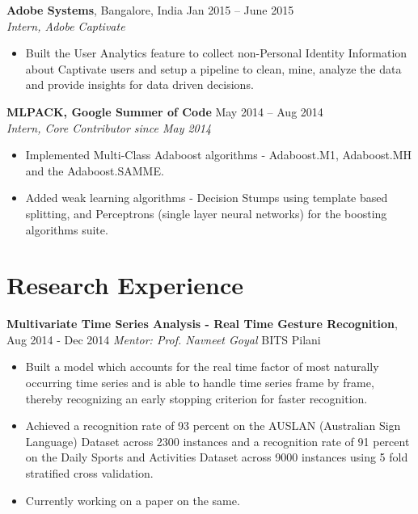 \documentclass[letterpaper]{article}
\begin{document}
\vspace{-0.5mm}
\textbf{Adobe Systems}, Bangalore, India \hfill Jan 2015 -- June 2015\\
\emph{Intern, Adobe Captivate}\\
\vspace{-6mm}
\begin{itemize}
\item Built the User Analytics feature to collect non-Personal Identity Information about Captivate users and setup a pipeline to clean, mine, analyze the data and provide insights for data driven decisions.
\end{itemize}

\vspace{-0.6mm}
\textbf{MLPACK, Google Summer of Code} \hfill May 2014 -- Aug 2014\\
\emph{Intern, Core Contributor since May 2014}\\
\vspace{-6mm}
\begin{itemize}
\item Implemented Multi-Class Adaboost algorithms - Adaboost.M1, Adaboost.MH and the Adaboost.SAMME.
\vspace{-2mm}
\item Added weak learning algorithms - Decision Stumps using template based splitting, and Perceptrons (single layer neural networks) for the boosting algorithms suite.
\end{itemize}


\section*{Research Experience}
\textbf{Multivariate Time Series Analysis - Real Time Gesture Recognition},  \hfill
Aug 2014 - Dec 2014
\emph{Mentor: Prof. Navneet Goyal} \hfill
BITS Pilani\\
\vspace{-6mm}
\begin{itemize}
\item Built a model which accounts for the real time factor of most naturally occurring time series and is able to handle time series frame by frame, thereby recognizing an early stopping criterion for faster recognition. 
\vspace{-2mm}
\item Achieved a recognition rate of 93 percent on the AUSLAN (Australian Sign Language) Dataset across 2300 instances and a recognition rate of 91 percent on the Daily Sports and Activities Dataset across 9000 instances using 5 fold stratified cross validation.
\vspace{-2mm}
\item Currently working on a paper on the same.
\end{itemize}
\end{document}
